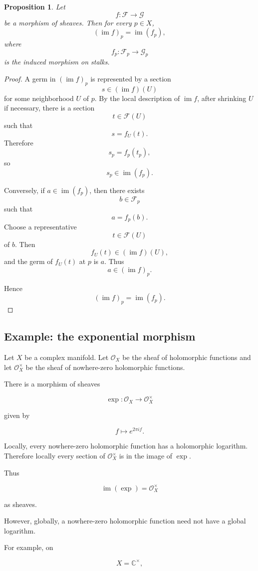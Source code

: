 \documentclass[12pt,a4paper]{article}
\newtheorem{proposition}{Proposition}[section]
\newcommand{\im}{\operatorname{im}}
\begin{document}
\begin{proposition}
	Let
	\[
	f:\mathcal F \longrightarrow \mathcal G
	\]
	be a morphism of sheaves.
	Then for every $p \in X$,
	\[
	(\im f)_p
	=
	\im(f_p),
	\]
	where
	\[
	f_p:\mathcal F_p\to\mathcal G_p
	\]
	is the induced morphism on stalks.
\end{proposition}

\begin{proof}
	A germ in $(\im f)_p$ is represented by a section
	\[
	s \in (\im f)(U)
	\]
	for some neighborhood $U$ of $p$.
	By the local description of $\im f$, after shrinking $U$ if necessary, there is
	a section
	\[
	t \in \mathcal F(U)
	\]
	such that
	\[
	s=f_U(t).
	\]
	Therefore
	\[
	s_p=f_p(t_p),
	\]
	so
	\[
	s_p \in \im(f_p).
	\]
	
	Conversely, if $a \in \im(f_p)$, then there exists
	\[
	b \in \mathcal F_p
	\]
	such that
	\[
	a=f_p(b).
	\]
	Choose a representative
	\[
	t \in \mathcal F(U)
	\]
	of $b$.
	Then
	\[
	f_U(t) \in (\im f)(U),
	\]
	and the germ of $f_U(t)$ at $p$ is $a$.
	Thus
	\[
	a \in (\im f)_p.
	\]
	
	Hence
	\[
	(\im f)_p=\im(f_p).
	\]
\end{proof}

\subsection{Example: the exponential morphism}

Let $X$ be a complex manifold.
Let $\mathcal O_X$ be the sheaf of holomorphic functions and let
$\mathcal O_X^\times$ be the sheaf of nowhere-zero holomorphic functions.

There is a morphism of sheaves

\[
\exp : \mathcal O_X \longrightarrow \mathcal O_X^\times
\]

given by

\[
f \longmapsto e^{2\pi i f}.
\]

Locally, every nowhere-zero holomorphic function has a holomorphic logarithm.
Therefore locally every section of $\mathcal O_X^\times$ is in the image of
$\exp$.

Thus

\[
\im(\exp)=\mathcal O_X^\times
\]

as sheaves.

However, globally, a nowhere-zero holomorphic function need not have a global
logarithm.

For example, on

\[
X=\mathbb C^\times,
\]
\end{document}

